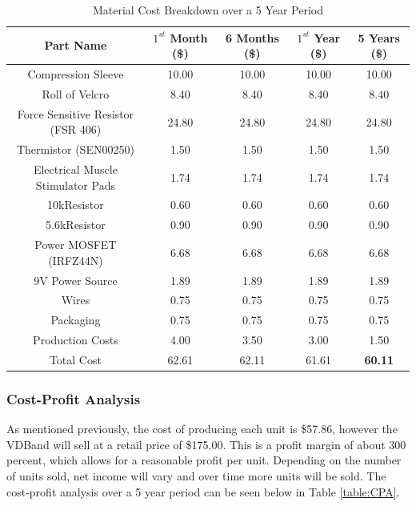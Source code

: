 \documentclass[11.5pt]{article}
\begin{document}
\begin{table}[H]
	\centering
	\caption{Material Cost Breakdown over a 5 Year Period}
	\vspace{3mm}
	\begin{tabular}{ccccc}
	\hline
		Part Name & $1^{st}$ Month (\$) & 6 Months (\$) & $1^{st}$ Year (\$) & 5 Years (\$) \\
	\hline
		Compression Sleeve & 10.00 & 10.00 & 10.00 & 10.00 \\
		Roll of Velcro  & 8.40 & 8.40 & 8.40 & 8.40 \\
		Force Sensitive Resistor (FSR 406) & 24.80 & 24.80 & 24.80 & 24.80 \\
		Thermistor (SEN00250) & 1.50 & 1.50 & 1.50 & 1.50 \\
		Electrical Muscle Stimulator Pads & 1.74 & 1.74 & 1.74 & 1.74\\
		10k\ohm Resistor & 0.60 & 0.60 & 0.60 & 0.60\\
		5.6k\ohm Resistor & 0.90 & 0.90 & 0.90 & 0.90\\
		Power MOSFET (IRFZ44N) & 6.68 & 6.68 & 6.68 & 6.68\\
		9V Power Source & 1.89 & 1.89 & 1.89 & 1.89\\
		Wires & 0.75 & 0.75 & 0.75 & 0.75\\
		Packaging & 0.75 & 0.75 & 0.75 & 0.75 \\
		Production Costs & 4.00 & 3.50 & 3.00 & 1.50 \\
	\hline
	    Total Cost & 62.61  & 62.11  & 61.61 & \textbf{60.11}\\
	 \hline 
		
	\end{tabular}
	\label{table:MCB}
\end{table}

\subsubsection{Cost-Profit Analysis}
As mentioned previously, the cost of producing each unit is \$57.86, however the VDBand will sell at a retail price of \$175.00. This is a profit margin of about 300 percent, which allows for a reasonable profit per unit. Depending on the number of units sold, net income will vary and over time more units will be sold. The cost-profit analysis over a 5 year period can be seen below in Table \ref{table:CPA}.
\end{document}
